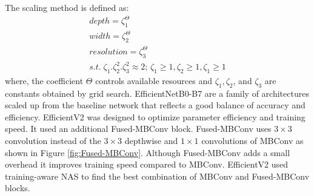 The scaling method is defined as:
\begin{gather*}
	depth=\zeta_{1}^{\Theta}\\
	width=\zeta_{2}^{\Theta}\\
	resolution=\zeta_{3}^{\Theta}\\
	s.t.\; \zeta_{1}.\zeta_{2}^{2}.\zeta_{3}^{2}\approx2;\,\zeta_{1}\geq1,\zeta_{2}\geq1,\zeta_{1}\geq1
\end{gather*}
where, the coefficient $\Theta$ controls available resources and $\zeta_{1},\zeta_{2}$, and $\zeta_{3}$ are constants obtained by grid search. EfficientNetB0-B7 are a family of architectures scaled up from the baseline network that reflects a good balance of accuracy and efficiency. EfficientV2 was designed to optimize parameter efficiency and training speed. It used an additional Fused-MBConv block. Fused-MBConv uses $3\times3$ convolution instead of the $3\times3$ depthwise and $1\times1$ convolutions of MBConv as shown in Figure \ref{fig:Fused-MBConv}. Although Fused-MBConv adds a small overhead it improves training speed compared to MBConv. EfficientV2 used training-aware NAS to find the best combination of MBConv and Fused-MBConv blocks. 

